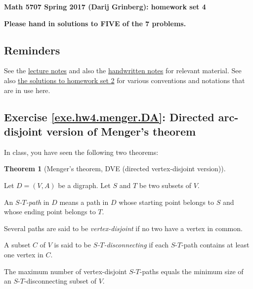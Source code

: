 \documentclass[numbers=enddot,12pt,final,onecolumn,notitlepage]{scrartcl}%
\theoremstyle{definition}
\newtheorem{theo}{Theorem}[section]
\newenvironment{theorem}[1][]
{\begin{theo}[#1]\begin{leftbar}}
{\end{leftbar}\end{theo}}
\newcommand{\tup}[1]{\left( #1 \right)}
\begin{document}
\begin{center}
\textbf{Math 5707 Spring 2017 (Darij Grinberg): homework set 4}


\textbf{Please hand in solutions to FIVE of the 7 problems.}
\end{center}


\subsection{Reminders}

See the
\href{http://www.cip.ifi.lmu.de/~grinberg/t/17s/nogra.pdf}{lecture notes}
and also the
\href{http://www.cip.ifi.lmu.de/~grinberg/t/17s/}{handwritten notes}
for relevant material.
See also
\href{http://www.cip.ifi.lmu.de/~grinberg/t/17s/hw2s.pdf}{the solutions to homework set 2}
for various conventions and notations that are in use here.

\subsection{Exercise \ref{exe.hw4.menger.DA}: Directed arc-disjoint
version of Menger's theorem}

In class, you have seen the following two theorems:

\begin{theorem}[Menger's theorem, DVE (directed vertex-disjoint
version)] \label{thm.menger.DVE}
Let $D = \tup{V, A}$ be a digraph.
Let $S$ and $T$ be two subsets of $V$.

An \textit{$S$-$T$-path} in $D$ means a path in $D$ whose starting
point belongs to $S$ and whose ending point belongs to $T$.

Several paths are said to be \textit{vertex-disjoint} if no two
have a vertex in common.

A subset $C$ of $V$ is said to be \textit{$S$-$T$-disconnecting} if
each $S$-$T$-path contains at least one vertex in $C$.

The maximum number of vertex-disjoint $S$-$T$-paths equals the
minimum size of an $S$-$T$-disconnecting subset of $V$.
\end{theorem}
\end{document}
